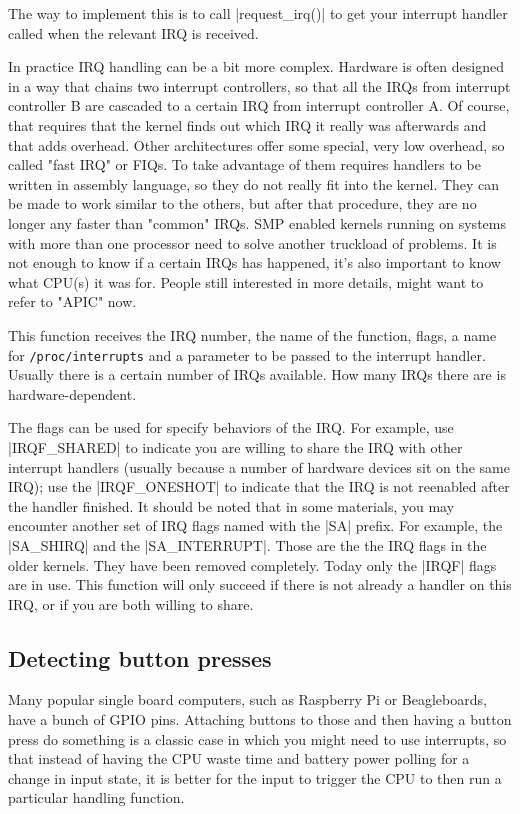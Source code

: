 \documentclass[10pt, oneside]{book}
\begin{document}
The way to implement this is to call \cpp|request_irq()| to get your interrupt handler called when the relevant IRQ is received.

In practice IRQ handling can be a bit more complex.
Hardware is often designed in a way that chains two interrupt controllers, so that all the IRQs from interrupt controller B are cascaded to a certain IRQ from interrupt controller A.
Of course, that requires that the kernel finds out which IRQ it really was afterwards and that adds overhead. Other architectures offer some special, very low overhead, so called "fast IRQ" or FIQs.
To take advantage of them requires handlers to be written in assembly language, so they do not really fit into the kernel.
They can be made to work similar to the others, but after that procedure, they are no longer any faster than "common" IRQs.
SMP enabled kernels running on systems with more than one processor need to solve another truckload of problems.
It is not enough to know if a certain IRQs has happened, it's also important to know what CPU(s) it was for.
People still interested in more details, might want to refer to "APIC" now.

This function receives the IRQ number, the name of the function, flags, a name for \verb|/proc/interrupts| and a parameter to be passed to the interrupt handler.
Usually there is a certain number of IRQs available.
How many IRQs there are is hardware-dependent.

The flags can be used for specify behaviors of the IRQ.
For example, use \cpp|IRQF_SHARED| to indicate you are willing to share the IRQ with other interrupt handlers (usually because a number of hardware devices sit on the same IRQ); use the \cpp|IRQF_ONESHOT| to indicate that the IRQ is not reenabled after the handler finished.
It should be noted that in some materials, you may encounter another set of IRQ flags named with the \cpp|SA| prefix.
For example, the \cpp|SA_SHIRQ| and the \cpp|SA_INTERRUPT|.
Those are the the IRQ flags in the older kernels.
They have been removed completely.
Today only the \cpp|IRQF| flags are in use.
This function will only succeed if there is not already a handler on this IRQ, or if you are both willing to share.

\subsection{Detecting button presses}
\label{sec:detect_button}
Many popular single board computers, such as Raspberry Pi or Beagleboards, have a bunch of GPIO pins.
Attaching buttons to those and then having a button press do something is a classic case in which you might need to use interrupts,
so that instead of having the CPU waste time and battery power polling for a change in input state, it is better for the input to trigger the CPU to then run a particular handling function.
\end{document}
